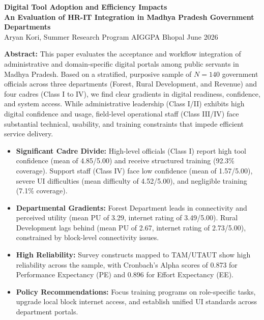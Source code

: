 \documentclass[10pt,a4paper]{article}
\begin{document}

\begin{center}
  {\fontsize{16}{19}\selectfont\bfseries\color{navyblue}
  Digital Tool Adoption and Efficiency Impacts\\[3pt]
  {\fontsize{12}{14}\selectfont\bfseries\color{accentteal}An Evaluation of HR-IT Integration in Madhya Pradesh Government Departments}}\\[4pt]
  {\small\color{darkgray} Aryan Kori, Summer Research Program \quad\textbar\quad AIGGPA Bhopal \quad\textbar\quad June 2026}
\end{center}

\vspace{0.1cm}
\noindent
\textbf{Abstract:} This paper evaluates the acceptance and workflow integration of administrative and domain-specific digital portals among public servants in Madhya Pradesh. Based on a stratified, purposive sample of $N=140$ government officials across three departments (Forest, Rural Development, and Revenue) and four cadres (Class I to IV), we find clear gradients in digital readiness, confidence, and system access. While administrative leadership (Class I/II) exhibits high digital confidence and usage, field-level operational staff (Class III/IV) face substantial technical, usability, and training constraints that impede efficient service delivery.

\vspace{0.2cm}

\begin{tcolorbox}[colback=navyblue!4,colframe=navyblue,leftrule=3.5pt,rightrule=0pt,toprule=0pt,bottomrule=0pt,arc=0pt,top=6pt,bottom=6pt,left=10pt,right=10pt]
\fontsize{9.5}{13}\selectfont
{}
\begin{itemize}
  \item \textbf{Significant Cadre Divide:} High-level officials (Class I) report high tool confidence (mean of 4.85/5.00) and receive structured training (92.3\% coverage). Support staff (Class IV) face low confidence (mean of 1.57/5.00), severe UI difficulties (mean difficulty of 4.52/5.00), and negligible training (7.1\% coverage).
  \item \textbf{Departmental Gradients:} Forest Department leads in connectivity and perceived utility (mean PU of 3.29, internet rating of 3.49/5.00). Rural Development lags behind (mean PU of 2.67, internet rating of 2.73/5.00), constrained by block-level connectivity issues.
  \item \textbf{High Reliability:} Survey constructs mapped to TAM/UTAUT show high reliability across the sample, with Cronbach's Alpha scores of 0.873 for Performance Expectancy (PE) and 0.896 for Effort Expectancy (EE).
  \item \textbf{Policy Recommendations:} Focus training programs on role-specific tasks, upgrade local block internet access, and establish unified UI standards across department portals.
\end{itemize}
\end{tcolorbox}
\end{document}
